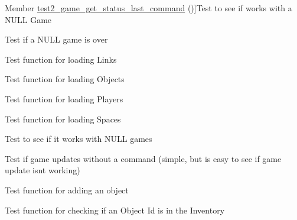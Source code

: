 \begin{DoxyRefList}
\hypertarget{test__test000081}{}%
Member \hyperlink{game__test_8h_a5828e75b146cd90e87938d17f5c0c114}{test2\+\_\+game\+\_\+get\+\_\+status\+\_\+last\+\_\+command} ()]Test to see if works with a N\+U\+LL Game  
\item[\label{test__test000037}%
\hypertarget{test__test000037}{}%
Member \hyperlink{game__test_8h_aad6c50be5f1d541ca5414b86558ef422}{test2\+\_\+game\+\_\+is\+\_\+over} ()]Test if a N\+U\+LL game is over  
\item[\label{test__test000024}%
\hypertarget{test__test000024}{}%
Member \hyperlink{game__reader__test_8h_a7366cf536491c6f3be1145b0d7b2b32c}{test2\+\_\+game\+\_\+reader\+\_\+load\+\_\+links} ()]Test function for loading Links  
\item[\label{test__test000020}%
\hypertarget{test__test000020}{}%
Member \hyperlink{game__reader__test_8h_a5bd7d88df7ebba1510197eafd63a4ca3}{test2\+\_\+game\+\_\+reader\+\_\+load\+\_\+objects} ()]Test function for loading Objects  
\item[\label{test__test000016}%
\hypertarget{test__test000016}{}%
Member \hyperlink{game__reader__test_8h_a2a92d2c5944de5ec790969ade0d10c8b}{test2\+\_\+game\+\_\+reader\+\_\+load\+\_\+players} ()]Test function for loading Players  
\item[\label{test__test000012}%
\hypertarget{test__test000012}{}%
Member \hyperlink{game__reader__test_8h_a1bf200d01046a242ee3379e62545fa01}{test2\+\_\+game\+\_\+reader\+\_\+load\+\_\+spaces} ()]Test function for loading Spaces  
\item[\label{test__test000074}%
\hypertarget{test__test000074}{}%
Member \hyperlink{game__test_8h_a2bee8c4494438aa5cdc301ca6ef40e88}{test2\+\_\+game\+\_\+set\+\_\+object\+\_\+location} ()]Test to see if it works with N\+U\+LL games  
\item[\label{test__test000033}%
\hypertarget{test__test000033}{}%
Member \hyperlink{game__test_8h_aa7c7e1467a24f4d1086096b73a38739e}{test2\+\_\+game\+\_\+update} ()]Test if game updates without a command (simple, but is easy to see if game update isnt working)  
\item[\label{test__test000094}%
\hypertarget{test__test000094}{}%
Member \hyperlink{inventory__test_8h_a48019cb45cb5918233d5d42334d2be17}{test2\+\_\+inventory\+\_\+add} ()]Test function for adding an object  
\item[\label{test__test000115}%
\hypertarget{test__test000115}{}%
Member \hyperlink{inventory__test_8h_a847aa346d12ebb77d86d202bd0fa99b6}{test2\+\_\+inventory\+\_\+check\+\_\+object} ()]Test function for checking if an Object Id is in the Inventory  

\end{DoxyRefList}
